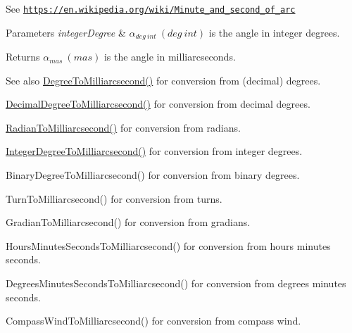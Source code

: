 See \href{https://en.wikipedia.org/wiki/Minute_and_second_of_arc}{\tt https\+://en.\+wikipedia.\+org/wiki/\+Minute\+\_\+and\+\_\+second\+\_\+of\+\_\+arc} 
\begin{DoxyParams}{Parameters}
{\em integer\+Degree} & $\alpha_{deg\ int}\ (deg\ int)$ is the angle in integer degrees. \\
\hline
\end{DoxyParams}
\begin{DoxyReturn}{Returns}
$\alpha_{mas}\ (mas)$ is the angle in milliarcseconds. 
\end{DoxyReturn}
\begin{DoxySeeAlso}{See also}
\mbox{\hyperlink{group___e_g_x_math-_angle_conversions-_degree_ga2c218e286b2ef72a00734dbc5a7f5ab6}{Degree\+To\+Milliarcsecond()}} for conversion from (decimal) degrees. 

\mbox{\hyperlink{group___e_g_x_math-_angle_conversions-_decimal_degree_gadb9ff3c92cf7484793f91e7de80c222e}{Decimal\+Degree\+To\+Milliarcsecond()}} for conversion from decimal degrees. 

\mbox{\hyperlink{group___e_g_x_math-_angle_conversions-_radian_ga84fbb494a455cfeb30be62776f96c9a9}{Radian\+To\+Milliarcsecond()}} for conversion from radians. 

\mbox{\hyperlink{group___e_g_x_math-_angle_conversions-_integer_degree_gadc43f22e832cd8fcf16b7bd2269ae348}{Integer\+Degree\+To\+Milliarcsecond()}} for conversion from integer degrees. 

Binary\+Degree\+To\+Milliarcsecond() for conversion from binary degrees. 

Turn\+To\+Milliarcsecond() for conversion from turns. 

Gradian\+To\+Milliarcsecond() for conversion from gradians. 

Hours\+Minutes\+Seconds\+To\+Milliarcsecond() for conversion from hours minutes seconds. 

Degrees\+Minutes\+Seconds\+To\+Milliarcsecond() for conversion from degrees minutes seconds. 

Compass\+Wind\+To\+Milliarcsecond() for conversion from compass wind. 
\end{DoxySeeAlso}
\mbox{\label{group___e_g_x_math-_angle_conversions-_integer_degree_ga5379a68bdff5cc4fab5bb1ba06ef9453}} 
